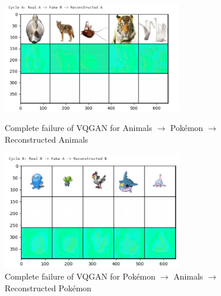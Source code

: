 \documentclass[twoside,english,notitlepage]{report}
\begin{document}
\begin{figure}[h]
    \centering
    \includegraphics[width=0.7\textwidth]{task2/failedvq1.jpg}
    \vspace{-10pt}
    \caption{Complete failure of VQGAN for Animals $\rightarrow$ Pokémon $\rightarrow$ Reconstructed Animals}
    \vspace{12pt}
    \includegraphics[width=0.7\textwidth]{task2/failedvq2.jpg}
    \vspace{-10pt}
    \caption{Complete failure of VQGAN for Pokémon $\rightarrow$ Animals $\rightarrow$ Reconstructed Pokémon}
    \vspace{12pt}
    \label{fig:failed-vq}
\end{figure}
\end{document}
